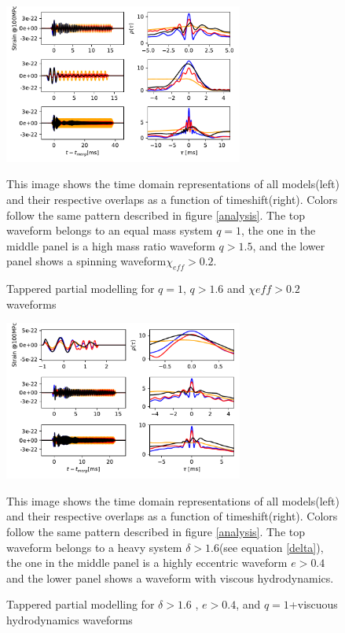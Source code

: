 \begin{figure}[hbt!]
\begin{center}
\includegraphics[width=0.7\textwidth, angle=0]{images/Data_analysis/results/phi-A3.pdf}
\caption{Tappered partial modelling for $q=1$, $q>1.6$ and $\chi{eff}>0.2$ waveforms}
\end{center}
This image shows the time domain representations of all models(left) and their respective overlaps as a function of timeshift(right). Colors follow the same pattern described in figure \ref{analysis}. The top waveform belongs to an equal mass system $q=1$, the one in the middle panel is a high mass ratio waveform $q>1.5$, and the lower panel shows a spinning waveform$\chi_{eff}>0.2$.
\end{figure}

\begin{figure}[hbt!]
\begin{center}
\includegraphics[width=0.7\textwidth, angle=0]{images/Data_analysis/results/phi-A4.pdf}
\caption{Tappered partial modelling for $\delta>1.6$ , $e>0.4$, and $q=1$+viscuous hydrodynamics waveforms}
\end{center}
This image shows the time domain representations of all models(left) and their respective overlaps as a function of timeshift(right). Colors follow the same pattern described in figure \ref{analysis}. The top waveform belongs to a heavy system $\delta>1.6$(see equation \ref{delta}), the one in the middle panel is a highly eccentric waveform $e>0.4$ and the lower panel shows a waveform with viscous hydrodynamics.
\end{figure}
\FloatBarrier

